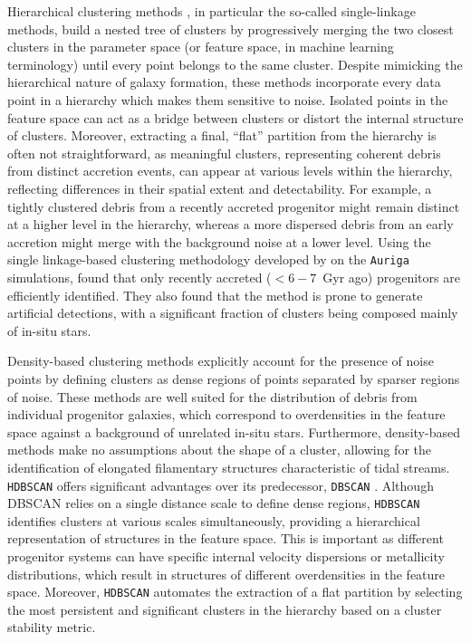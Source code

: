 Hierarchical clustering methods \citep[see review of][]{Murtagh2012}, in particular the so-called single-linkage methods, build a nested tree of clusters by progressively merging the two closest clusters in the parameter space (or feature space, in machine learning terminology) until every point belongs to the same cluster. Despite mimicking the hierarchical nature of galaxy formation, these methods incorporate every data point in a hierarchy which makes them sensitive to noise. Isolated points in the feature space can act as a bridge between clusters or distort the internal structure of clusters. Moreover, extracting a final, ``flat'' partition from the hierarchy is often not straightforward, as meaningful clusters, representing coherent debris from distinct accretion events, can appear at various levels within the hierarchy, reflecting differences in their spatial extent and detectability. For example, a tightly clustered debris from a recently accreted progenitor might remain distinct at a higher level in the hierarchy, whereas a more dispersed debris from an early accretion might merge with the background noise at a lower level. Using the single linkage-based clustering methodology developed by \citet{Lovdal2022} on the \texttt{Auriga} simulations, \citet{Thomas2025} found that only recently accreted ($<6-7$~Gyr ago) progenitors are efficiently identified. They also found that the method is prone to generate artificial detections, with a significant fraction of clusters being composed mainly of in-situ stars.

Density-based clustering methods \citep[e.g., DBSCAN, HDBSCAN;][]{Ester1996,Ankerst1999,Campello2013} explicitly account for the presence of noise points by defining clusters as dense regions of points separated by sparser regions of noise. These methods are well suited for the distribution of debris from individual progenitor galaxies, which correspond to overdensities in the feature space against a background of unrelated in-situ stars. Furthermore, density-based methods make no assumptions about the shape of a cluster, allowing for the identification of elongated filamentary structures characteristic of tidal streams.  \texttt{HDBSCAN} \citep[Hierarchical Density-Based Spatial Clustering of Applications with Noise,][]{Campello2013} offers significant advantages over its predecessor, \texttt{DBSCAN} \citep{Ester1996}. Although DBSCAN relies on a single distance scale to define dense regions, \texttt{HDBSCAN} identifies clusters at various scales simultaneously, providing a hierarchical representation of structures in the feature space. This is important as different progenitor systems can have specific internal velocity dispersions or metallicity distributions, which result in structures of different overdensities in the feature space.
Moreover, \texttt{HDBSCAN} automates the extraction of a flat partition by selecting the most persistent and significant clusters in the hierarchy based on a cluster stability metric.

